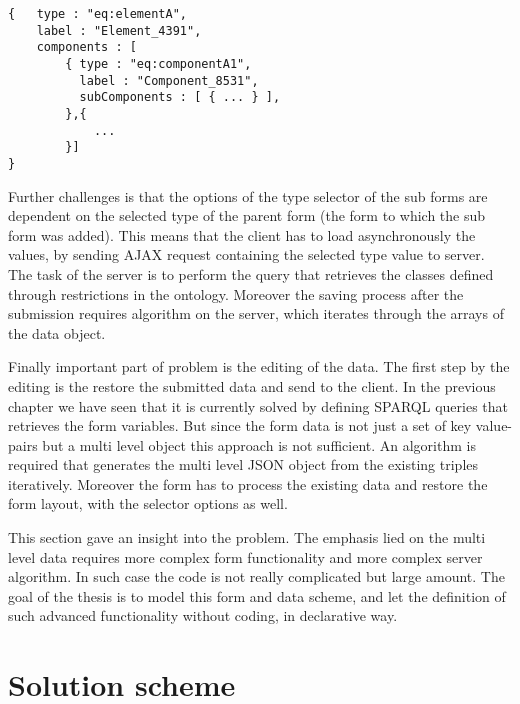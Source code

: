 \begin{lstlisting}[basicstyle=\footnotesize, frame=single, caption={Multi level form data in JSON}, label=multiData, captionpos=b, belowskip=1em, aboveskip=2em]
{	type : "eq:elementA",
	label : "Element_4391",
	components : [
		{ type : "eq:componentA1",
		  label : "Component_8531",	
		  subComponents : [ { ... } ],
		},{ 
			... 
		}]
}
\end{lstlisting}

Further challenges is that the options of the type selector of the sub forms are dependent on the selected type of the parent form (the form to which the sub form was added). This means that the client has to load asynchronously the values, by sending AJAX request containing the selected type value to server. The task of the server is to perform the query that retrieves the classes defined through restrictions in the ontology. Moreover the saving process after the submission requires algorithm on the server, which iterates through the arrays of the data object.

Finally important part of problem is the editing of the data. The first step by the editing is the restore the submitted data and send to the client. In the previous chapter we have seen that it is currently solved by defining  SPARQL queries that retrieves the form variables. But since the form data is not just a set of key value-pairs but a multi level object this approach is not sufficient. An algorithm is required that generates the multi level JSON object from the existing triples iteratively. Moreover the form has to process the existing data and restore the form layout, with the selector options as well. 

This section gave an insight into the problem. The emphasis lied on the multi level data requires more complex form functionality and more complex server algorithm. In such case the code is not really complicated but large amount. The goal of the thesis is to model this form and data scheme, and let the definition of such advanced functionality without coding, in declarative way. 


\section{Solution scheme}




